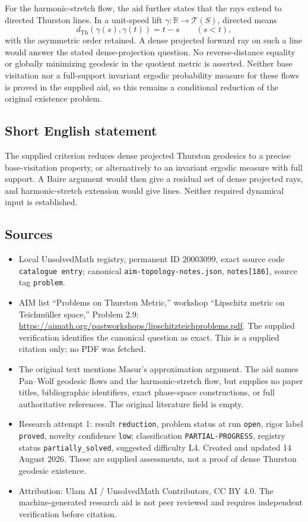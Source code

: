\documentclass[11pt]{article}
\newcommand{\R}{\mathbb{R}}
\begin{document}
For the harmonic-stretch flow, the aid further states that the rays extend to directed Thurston lines. In a unit-speed lift \(\gamma:\R\to\mathcal T(S)\), directed means
\[
 d_{\mathrm{Th}}(\gamma(s),\gamma(t))=t-s\qquad(s<t),
\]
with the asymmetric order retained. A dense projected forward ray on such a line would answer the stated dense-projection question. No reverse-distance equality or globally minimizing geodesic in the quotient metric is asserted. Neither base visitation nor a full-support invariant ergodic probability measure for these flows is proved in the supplied aid, so this remains a conditional reduction of the original existence problem.
\subsection{Short English statement}
The supplied criterion reduces dense projected Thurston geodesics to a precise base-visitation property, or alternatively to an invariant ergodic measure with full support. A Baire argument would then give a residual set of dense projected rays, and harmonic-stretch extension would give lines. Neither required dynamical input is established.
\subsection{Sources}
\begin{itemize}
\item Local UnsolvedMath registry, permanent ID \(20003099\), exact source code \texttt{catalogue entry}; canonical \texttt{aim-topology-notes.json}, \texttt{notes[186]}, source tag \texttt{problem}.
\item AIM list ``Problems on Thurston Metric,'' workshop ``Lipschitz metric on Teichm\"uller space,'' Problem 2.9: \url{https://aimath.org/pastworkshops/lipschitzteichproblems.pdf}. The supplied verification identifies the canonical question as exact. This is a supplied citation only; no PDF was fetched.
\item The original text mentions Masur's approximation argument. The aid names Pan--Wolf geodesic flows and the harmonic-stretch flow, but supplies no paper titles, bibliographic identifiers, exact phase-space constructions, or full authoritative references. The original literature field is empty.
\item Research attempt 1: result \texttt{reduction}, problem status at run \texttt{open}, rigor label \texttt{proved}, novelty confidence \texttt{low}; classification \texttt{PARTIAL-PROGRESS}, registry status \texttt{partially\_solved}, suggested difficulty L4. Created and updated 14 August 2026. These are supplied assessments, not a proof of dense Thurston geodesic existence.
\item Attribution: Ulam AI / UnsolvedMath Contributors, CC BY 4.0. The machine-generated research aid is not peer reviewed and requires independent verification before citation.
\end{itemize}
\end{document}
